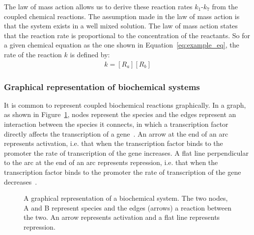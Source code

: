 The law of mass action allows us to derive these reaction rates $k_1$-$k_7$ from the coupled chemical reactions. The assumption made in the law of mass action is that the system exists in a well mixed solution. The law of mass action states that the reaction rate is proportional to the concentration of the reactants. So for a given chemical equation as the one shown in Equation~\ref{eq:example_eq}, the rate of the reaction $k$ is defined by:
\begin{align*}
	k = [R_a][R_b]
\end{align*}



\subsubsection{Graphical representation of biochemical systems}

It is common to represent coupled biochemical reactions graphically. In a graph, as shown in Figure~\ref{fig:Toggle_switch_example}, nodes represent the species and the edges represent an interaction between the species it connects, in which a transcription factor directly affects the transcription of a gene~\autocite{Alon:2007}. An arrow at the end of an arc represents activation, i.e. that when the transcription factor binds to the promoter the rate of transcription of the gene increases. A flat line perpendicular to the arc at the end of an arc represents repression, i.e. that when the transcription factor binds to the promoter the rate of transcription of the gene decreases~\autocite{Alon:2007}.

\begin{figure}[h!]
\begin{center}
\caption[A graphical representation of a biochemical system]{A graphical representation of a biochemical system. The two nodes, A and B represent species and the edges (arrows) a reaction between the two. An arrow represents activation and a flat line represents repression.}
\label{fig:Toggle_switch_example}
\end{center}

\end{figure}	



